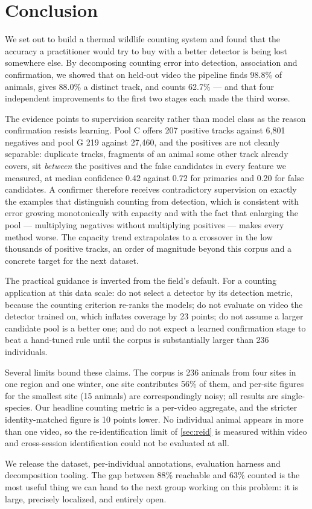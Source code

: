 \section{Conclusion}
\label{sec:conclusion}

We set out to build a thermal wildlife counting system and found that the accuracy a
practitioner would try to buy with a better detector is being lost somewhere else. By
decomposing counting error into detection, association and confirmation, we showed that on
held-out video the pipeline finds 98.8\% of animals, gives 88.0\% a distinct track, and
counts 62.7\% --- and that four independent improvements to the first two stages each made
the third worse.

The evidence points to supervision scarcity rather than model class as the reason
confirmation resists learning. Pool C offers 207 positive tracks against 6,801 negatives and
pool G 219 against 27,460, and the positives are not cleanly separable: duplicate tracks,
fragments of an animal some other track already covers, sit \emph{between} the positives and
the false candidates in every feature we measured, at median confidence 0.42 against 0.72
for primaries and 0.20 for false candidates. A confirmer therefore receives contradictory
supervision on exactly the examples that distinguish counting from detection, which is
consistent with error growing monotonically with capacity and with the fact that enlarging
the pool --- multiplying negatives without multiplying positives --- makes every method worse.
The capacity trend extrapolates to a crossover in the low thousands of positive tracks, an
order of magnitude beyond this corpus and a concrete target for the next dataset.

The practical guidance is inverted from the field's default. For a counting application at
this data scale: do not select a detector by its detection metric, because the counting
criterion re-ranks the models; do not evaluate on video the detector trained on, which
inflates coverage by 23 points; do not assume a larger candidate pool is a better one; and
do not expect a learned confirmation stage to beat a hand-tuned rule until the corpus is
substantially larger than 236 individuals.

Several limits bound these claims. The corpus is 236 animals from four sites in one region
and one winter, one site contributes 56\% of them, and per-site figures for the smallest
site (15 animals) are correspondingly noisy; all results are single-species. Our headline
counting metric is a per-video aggregate, and the stricter identity-matched figure is 10
points lower. No individual animal appears in more than one video, so the re-identification
limit of \cref{sec:reid} is measured within video and cross-session identification could not
be evaluated at all.

We release the dataset, per-individual annotations, evaluation harness and decomposition
tooling. The gap between 88\% reachable and 63\% counted is the most useful thing we can
hand to the next group working on this problem: it is large, precisely localized, and
entirely open.
